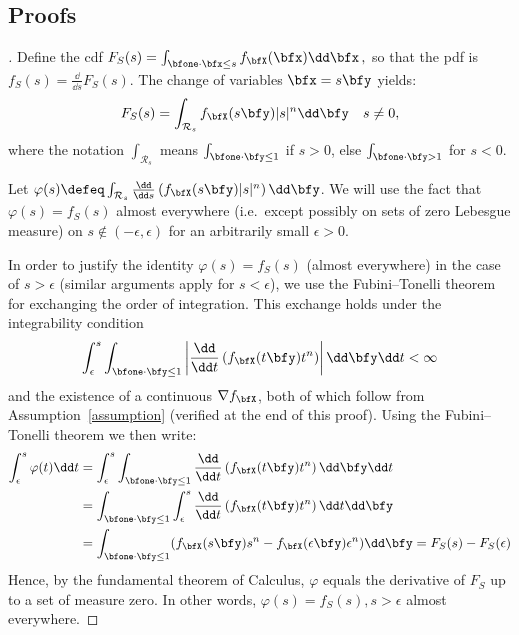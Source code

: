 \begin{subappendices}

\section{Proofs}


\begin{proof}[]

Define the cdf $F_S(s) =\int_{\bfone \cdot \bfx \le s} f_{\bfX}(\bfx) \dd \bfx \,,$
so that the pdf is
$
f_S(s) =\frac{\dd}{\dd s}  F_S(s)
$.
The change of variables  $\bfx = s \bfy$ yields:
\[
 F_S(s)=\int_{\mathcal{R}_s} f_{\bfX}(s \bfy) |s|^n \dd \bfy\quad s\not =0,
\]
where the notation $\int_{\mathcal{R}_s}$ means $\int_{\bfone\cdot\bfy\le 1}$ if $s >0$, else $\int_{\bfone\cdot\bfy> 1}$ for $s<0$.

Let $\varphi(s) \defeq \int_{\mathcal{R}_s}\frac{\dd}{\dd s} \left( f_{\bfX}(s \bfy)  |s|^n\right)\dd \bfy $. We will use the fact
that $\varphi(s)=f_S(s)$ almost everywhere (i.e.\ except possibly on sets of zero Lebesgue measure) on $s\not\in(-\epsilon,\epsilon)$ for an arbitrarily small $\epsilon>0$.


In order to justify  the identity $\varphi(s)=f_S(s)$
(almost everywhere) in the case of
$s>\epsilon$ (similar arguments apply for $s<\epsilon$),
we use the Fubini--Tonelli theorem for exchanging the order of
integration. This exchange
holds under the integrability condition
\begin{equation}
\label{integrability}
\int_\epsilon^s\int_{\bfone\cdot\bfy\le 1}\left|\frac{\dd}{\dd t} \left( f_{\bfX}(t \bfy)  t^n\right)\right|\dd \bfy\dd t<\infty
\end{equation}
and the existence of a continuous $\nabla f_{\bfX}$, both of which follow from  Assumption~\ref{assumption} (verified at the end of this proof). Using the Fubini--Tonelli theorem \cite{rosenthal2006first} we then write:
\[
\begin{split}
\int_\epsilon^s\varphi(t)\dd t&=\int_\epsilon^s\int_{\bfone\cdot\bfy\le 1}\frac{\dd}{\dd t} \left( f_{\bfX}(t \bfy)  t^n\right)\dd \bfy\dd t\\
&=\int_{\bfone\cdot\bfy\le 1}\int_\epsilon^s\frac{\dd}{\dd t} \left( f_{\bfX}(t \bfy)  t^n\right)\dd t\dd \bfy\\
&=\int_{\bfone\cdot\bfy\le 1} ( f_{\bfX}(s \bfy)  s^n -
 f_{\bfX}(\epsilon \bfy)  \epsilon^n)\dd \bfy=F_S(s)-F_S(\epsilon)
\end{split}
\]
Hence, by the fundamental theorem of Calculus,   $\varphi$ equals the  derivative of $F_S$ up to a set of measure zero.
In other words, $\varphi(s)=f_S(s),s>\epsilon$ almost everywhere.




\end{proof}
\end{subappendices}
